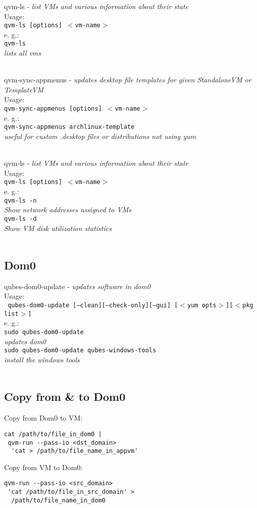 \documentclass[10pt,a4paper,landscape,twocolumn]{scrartcl}
\newcommand{\desc}[2]{\noindent #1 - \textit{#2} \\}
\newcommand{\usage}[1]{ Usage: \\ \texttt{#1} \\}
\newenvironment{examplebox}{e. g.: \\}{}
\newcommand{\example}[2]{\texttt{#1} \\ \textit{#2} \\}
\newenvironment{cmdblock}{}{\\}
\begin{document}
\begin{cmdblock}
	\desc{qvm-ls}{list VMs and various information about their state}
	\usage{qvm-ls [options] $<$vm-name$>$}
	\begin{examplebox}
		\example{qvm-ls}{lists all vms}
	\end{examplebox}
\end{cmdblock}

\begin{cmdblock}
	\desc{qvm-sync-appmenus}{updates desktop file templates for given StandaloneVM or TemplateVM}
	\usage{qvm-sync-appmenus [options] $<$vm-name$>$}
	\begin{examplebox}
		\example{qvm-sync-appmenus archlinux-template}{useful for custom .desktop files or distributions not using yum}
	\end{examplebox}
\end{cmdblock}

\begin{cmdblock}
	\desc{qvm-ls}{list VMs and various information about their state}
	\usage{qvm-ls [options] $<$vm-name$>$}
	\begin{examplebox}
		\example{qvm-ls -n}{Show network addresses assigned to VMs}
		\example{qvm-ls -d}{Show VM disk utilization statistics}
	\end{examplebox}
\end{cmdblock}

\subsection*{Dom0}
\begin{cmdblock}
	\desc{qubes-dom0-update}{updates software in dom0}
	\usage{ qubes-dom0-update [--clean][--check-only][--gui] [$<$yum opts$>$][$<$pkg list$>$]}
	\begin{examplebox}
		\example{sudo qubes-dom0-update}{updates dom0}
		\example{sudo qubes-dom0-update qubes-windows-tools}{install the windows tools}
	\end{examplebox}
\end{cmdblock}

\subsection*{Copy from \& to Dom0}
Copy from Dom0 to VM:\\
\begin{verbatim}
cat /path/to/file_in_dom0 | 
 qvm-run --pass-io <dst_domain> 
  'cat > /path/to/file_name_in_appvm'
\end{verbatim}
Copy from VM to Dom0:\\
\begin{verbatim}
qvm-run --pass-io <src_domain> 
 'cat /path/to/file_in_src_domain' >
  /path/to/file_name_in_dom0
\end{verbatim}
\end{document}
